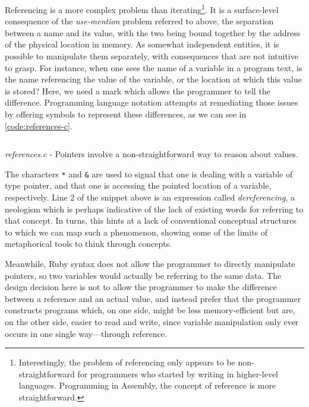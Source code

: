 Referencing is a more complex problem than iterating\footnote{Interestingly, the problem of referencing only appears to be non-straightforward for programmers who started by writing in higher-level languages. Programming in Assembly, the concept of reference is more straightforward.}. It is a surface-level consequence of the \emph{use-mention} problem referred to above, the separation between a name and its value, with the two being bound together by the address of the physical location in memory. As somewhat independent entities, it is possible to manipulate them separately, with consequences that are not intuitive to grasp. For instance, when one sees the name of a variable in a program text, is the name referencing the value of the variable, or the location at which this value is stored? Here, we need a mark which allows the programmer to tell the difference. Programming language notation attempts at remediating those issues by offering symbols to represent these differences, as we can see in \autoref{code:references-c}.

\begin{listing}
  \inputminted{c}{./corpus/references.c}
  \caption{\emph{references.c} - Pointers involve a non-straightforward way to reason about values.}
  \label{code:references-c}
\end{listing}

The characters \lstinline{*} and \lstinline{&} are used to signal that one is dealing with a variable of type pointer, and that one is accessing the pointed location of a variable, respectively. Line 2 of the snippet above is an expression called \emph{dereferencing}, a neologism which is perhaps indicative of the lack of existing words for referring to that concept. In turns, this hints at a lack of conventional conceptual structures to which we can map such a phenomenon, showing some of the limits of metaphorical tools to think through concepts.

Meanwhile, Ruby syntax does not allow the programmer to directly manipulate pointers, so two variables would actually be referring to the same data. The design decision here is not to allow the programmer to make the difference between a reference and an actual value, and instead prefer that the programmer constructs programs which, on one side, might be less memory-efficient but are, on the other side, easier to read and write, since variable manipulation only ever occurs in one single way—through reference.

